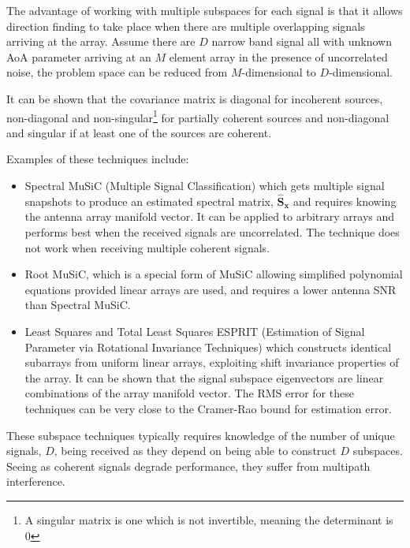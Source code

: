 The advantage of working with multiple subspaces for each signal is that it allows direction finding to take place when there are multiple overlapping signals arriving at the array. Assume there are \(D\) narrow band signal all with unknown AoA parameter arriving at an \(M\) element array in the presence of uncorrelated noise, the problem space can be reduced from \(M\)-dimensional to \(D\)-dimensional\cite{van2004detection}.

It can be shown that the covariance matrix is diagonal for incoherent sources, non-diagonal and non-singular\footnote{A singular matrix is one which is not invertible, meaning the determinant is 0} for partially coherent sources and non-diagonal and singular if at least one of the sources are coherent\cite{poisel2012electronic}. 

Examples of these techniques include\cite{van2004detection}:
\begin{itemize}
  \item Spectral MuSiC (Multiple Signal Classification) which gets multiple signal snapshots to produce an estimated spectral matrix, \(\hat{\mathbf{S}}_{\mathbf{x}}\) and requires knowing the antenna array manifold vector. It can be applied to arbitrary arrays and performs best when the received signals are uncorrelated. The technique does not work when receiving multiple coherent signals.
  \item Root MuSiC, which is a special form of MuSiC allowing simplified polynomial equations provided linear arrays are used, and requires a lower antenna SNR than Spectral MuSiC.
  \item Least Squares and Total Least Squares ESPRIT (Estimation of Signal Parameter via Rotational Invariance Techniques) which constructs identical subarrays from uniform linear arrays, exploiting shift invariance properties of the array. It can be shown that the signal subspace eigenvectors are linear combinations of the array manifold vector. The RMS error for these techniques can be very close to the Cramer-Rao bound for estimation error\cite{van2004detection}.
\end{itemize}
These subspace techniques typically requires knowledge of the number of unique signals, \(D\), being received as they depend on being able to construct \(D\) subspaces. Seeing as coherent signals degrade performance, they suffer from multipath interference.
